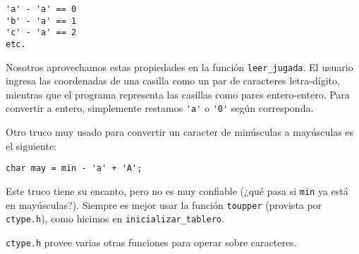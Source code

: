 \begin{lstlisting}
'a' - 'a' == 0
'b' - 'a' == 1
'c' - 'a' == 2
etc.
\end{lstlisting}

Nosotros aprovechamos estas propiedades en la función
\lstinline!leer_jugada!. El usuario ingresa las coordenadas de una
casilla como un par de caracteres letra-dígito, mientras que el programa
representa las casillas como pares entero-entero. Para convertir a
entero, simplemente restamos \lstinline!'a'! o \lstinline!'0'! según
corresponda.

Otro truco muy usado para convertir un caracter de minúsculas a
mayúsculas es el siguiente:

\begin{lstlisting}
char may = min - 'a' + 'A';
\end{lstlisting}

Este truco tiene su encanto, pero no es muy confiable (¿qué pasa si
\lstinline!min! ya está en mayúsculas?). Siempre es mejor usar la
función \lstinline!toupper! (provista por \lstinline!ctype.h!), como
hicimos en \lstinline!inicializar_tablero!.

\lstinline!ctype.h! provee varias otras funciones para operar sobre
caracteres.
